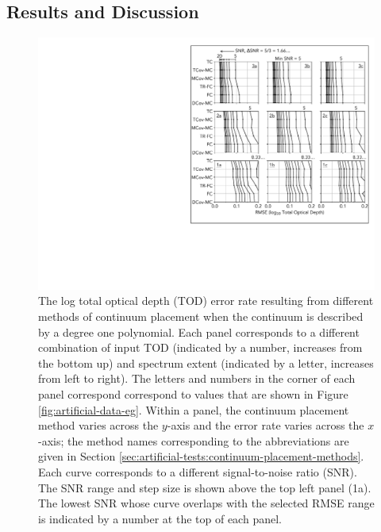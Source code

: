 \documentclass[trackchanges]{aastex62}
\begin{document}
{\color{red} \bf
\subsection{Results and Discussion}

\begin{figure}
  \includegraphics[width=\linewidth]{figures/annotated_co1_RMSEs_vs_SNR.pdf}
  \caption{
  The log total optical depth (TOD) error rate resulting from different methods of continuum placement when the continuum is described by a degree one polynomial.
  Each panel corresponds to a different combination of input TOD (indicated by a number, increases from the bottom up) and spectrum extent (indicated by a letter, increases from left to right).
  The letters and numbers in the corner of each panel correspond correspond to values that are shown in Figure \ref{fig:artificial-data-eg}.
  Within a panel, the continuum placement method varies across the $y$-axis and the error rate varies across the $x$-axis; the method names corresponding to the abbreviations are given in Section \ref{sec:artificial-tests:continuum-placement-methods}.
  Each curve corresponds to a different signal-to-noise ratio (SNR).
  The SNR range and step size is shown above the top left panel (1a).
  The lowest SNR whose curve overlaps with the selected RMSE range is indicated by a number at the top of each panel.
  }
  \label{fig:outcomes-CO-1}
\end{figure}

}
\end{document}

